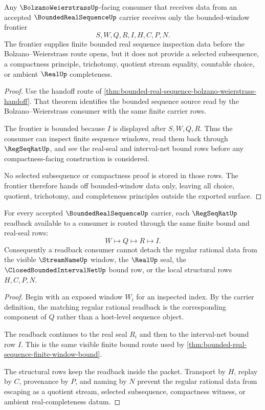 \begin{theorem}
\label{thm:bounded-real-sequence-bolzano-frontier}
Any $\BolzanoWeierstrassUp$-facing consumer that receives data from an accepted $\BoundedRealSequenceUp$ carrier receives only the bounded-window frontier
$$
S,W,Q,R,I,H,C,P,N .
$$
The frontier supplies finite bounded real sequence inspection data before the Bolzano--Weierstrass route opens, but it does not provide a selected subsequence, a compactness principle, trichotomy, quotient stream equality, countable choice, or ambient $\RealUp$ completeness.
\end{theorem}
\begin{proof}
Use the handoff route of \autoref{thm:bounded-real-sequence-bolzano-weierstrass-handoff}. That theorem identifies the bounded sequence source read by the Bolzano--Weierstrass consumer with the same finite carrier rows.

The frontier is bounded because $I$ is displayed after $S,W,Q,R$. Thus the consumer can inspect finite sequence windows, read them back through $\RegSeqRatUp$, and see the real-seal and interval-net bound rows before any compactness-facing construction is considered.

No selected subsequence or compactness proof is stored in those rows. The frontier therefore hands off bounded-window data only, leaving all choice, quotient, trichotomy, and completeness principles outside the exported surface.
\end{proof}

\begin{theorem}
\label{thm:bounded-real-sequence-regseqrat-readback}
For every accepted $\BoundedRealSequenceUp$ carrier, each $\RegSeqRatUp$ readback available to a consumer is routed through the same finite bound and real-seal rows:
$$
W\longmapsto Q\longmapsto R\longmapsto I .
$$
Consequently a readback consumer cannot detach the regular rational data from the visible $\StreamNameUp$ window, the $\RealUp$ seal, the $\ClosedBoundedIntervalNetUp$ bound row, or the local structural rows $H,C,P,N$.
\end{theorem}
\begin{proof}
Begin with an exposed window $W_i$ for an inspected index. By the carrier definition, the matching regular rational readback is the corresponding component of $Q$ rather than a host-level sequence object.

The readback continues to the real seal $R_i$ and then to the interval-net bound row $I$. This is the same visible finite bound route used by \autoref{thm:bounded-real-sequence-finite-window-bound}.

The structural rows keep the readback inside the packet. Transport by $H$, replay by $C$, provenance by $P$, and naming by $N$ prevent the regular rational data from escaping as a quotient stream, selected subsequence, compactness witness, or ambient real-completeness datum.
\end{proof}

